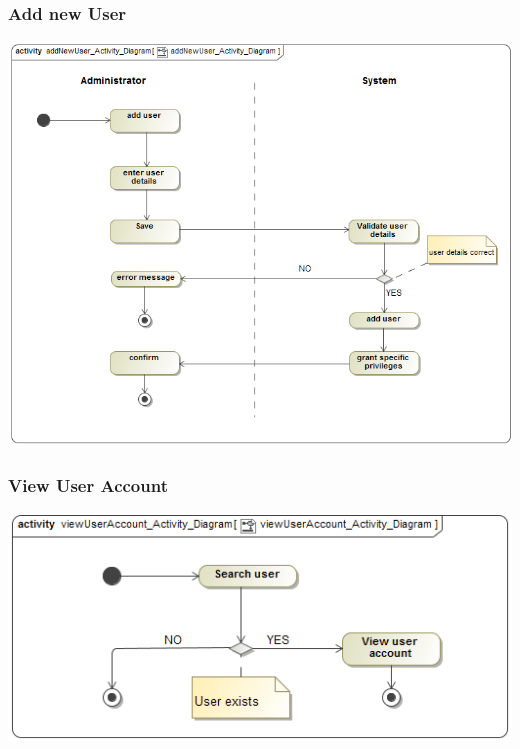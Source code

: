 \documentclass[11pt]{article}
\begin{document}
	\newpage
	\subsubsection{Add new User}
	\begin{center}
		\includegraphics[width=\textwidth]{../Diagrams/ActivityDiagrams/addNewUser_Activity_Diagram.png}\\[0.5cm]
	\end{center}

	\newpage
	\subsubsection{View User Account}
	\begin{center}
		\includegraphics[width=\textwidth]{../Diagrams/ActivityDiagrams/viewUserAccount_Activity_Diagram.png}\\[0.5cm]
	\end{center}
	
	\newpage
\end{document}
